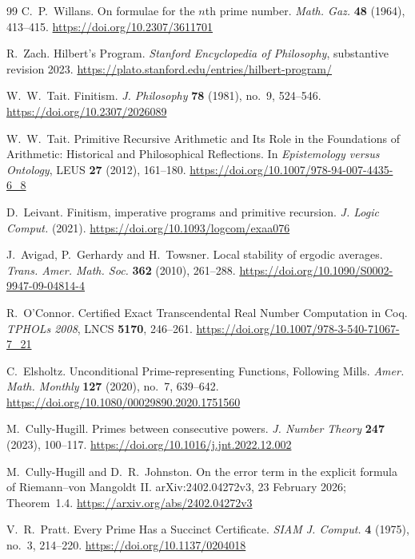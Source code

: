 \documentclass[11pt,reqno]{amsart}
\theoremstyle{blueplain}
\numberwithin{equation}{section}
\begin{document}
\begin{thebibliography}{99}
	C.~P.~Willans.
	On formulae for the \(n\)th prime number.
	\emph{Math. Gaz.} \textbf{48} (1964), 413--415.
	\url{https://doi.org/10.2307/3611701}
	
	R.~Zach.
	Hilbert's Program.
	\emph{Stanford Encyclopedia of Philosophy},
	substantive revision 2023.
	\url{https://plato.stanford.edu/entries/hilbert-program/}
	
	W.~W.~Tait.
	Finitism.
	\emph{J. Philosophy} \textbf{78} (1981), no.~9, 524--546.
	\url{https://doi.org/10.2307/2026089}
	
	W.~W.~Tait.
	Primitive Recursive Arithmetic and Its Role in the Foundations of
	Arithmetic: Historical and Philosophical Reflections.
	In \emph{Epistemology versus Ontology},
	LEUS \textbf{27} (2012), 161--180.
	\url{https://doi.org/10.1007/978-94-007-4435-6_8}
	
	D.~Leivant.
	Finitism, imperative programs and primitive recursion.
	\emph{J. Logic Comput.} (2021).
	\url{https://doi.org/10.1093/logcom/exaa076}
	
	J.~Avigad, P.~Gerhardy and H.~Towsner.
	Local stability of ergodic averages.
	\emph{Trans. Amer. Math. Soc.} \textbf{362} (2010), 261--288.
	\url{https://doi.org/10.1090/S0002-9947-09-04814-4}
	
	R.~O'Connor.
	Certified Exact Transcendental Real Number Computation in Coq.
	\emph{TPHOLs 2008}, LNCS \textbf{5170}, 246--261.
	\url{https://doi.org/10.1007/978-3-540-71067-7_21}
	
	C.~Elsholtz.
	Unconditional Prime-representing Functions, Following Mills.
	\emph{Amer. Math. Monthly} \textbf{127} (2020), no.~7, 639--642.
	\url{https://doi.org/10.1080/00029890.2020.1751560}
	
	M.~Cully-Hugill.
	Primes between consecutive powers.
	\emph{J. Number Theory} \textbf{247} (2023), 100--117.
	\url{https://doi.org/10.1016/j.jnt.2022.12.002}
	
	M.~Cully-Hugill and D.~R.~Johnston.
	On the error term in the explicit formula of Riemann--von Mangoldt II.
	arXiv:2402.04272v3, 23 February 2026; Theorem~1.4.
	\url{https://arxiv.org/abs/2402.04272v3}
	
	V.~R.~Pratt.
	Every Prime Has a Succinct Certificate.
	\emph{SIAM J. Comput.} \textbf{4} (1975), no.~3, 214--220.
	\url{https://doi.org/10.1137/0204018}
	

\end{thebibliography}
\end{document}
